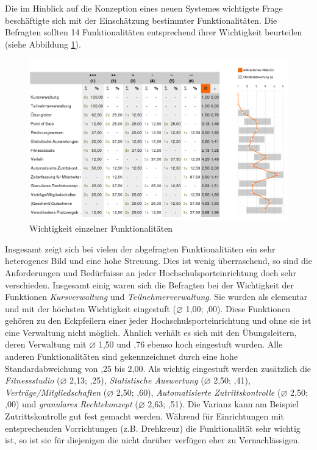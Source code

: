 Die im Hinblick auf die Konzeption eines neuen Systemes wichtigste Frage beschäftigte sich mit der Einschätzung bestimmter Funktionalitäten. Die Befragten sollten 14 Funktionalitäten entsprechend ihrer Wichtigkeit beurteilen (siehe Abbildung \ref{fig:Umfrage_funktionen}).
	\begin{figure}[h]
		\centering
		\includegraphics[width=1\linewidth]{images/umfrage_funktionen}
		\caption{Wichtigkeit einzelner Funktionalitäten}
		\label{fig:Umfrage_funktionen}
	\end{figure}

Insgesamt zeigt sich bei vielen der abgefragten Funktionalitäten ein sehr heterogenes Bild und eine hohe Streuung. Dies ist wenig überraschend, so sind die Anforderungen und Bedürfnisse an jeder Hochschulsporteinrichtung doch sehr verschieden.
Insgesamt einig waren sich die Befragten bei der Wichtigkeit der Funktionen \textit{Kursverwaltung} und \textit{Teilnehmerverwaltung}. Sie wurden als elementar und mit der höchsten Wichtigkeit eingestuft ($\varnothing$ 1,00; ,00). Diese Funktionen gehören zu den Eckpfeilern einer jeder Hochschulsporteinrichtung und ohne sie ist eine Verwaltung nicht möglich. Ähnlich verhält es sich mit den Übungsleitern, deren Verwaltung mit $\varnothing$ 1,50 und ,76 ebenso hoch eingestuft wurden.
Alle anderen Funktionalitäten sind gekennzeichnet durch eine hohe Standardabweichung von ,25 bis 2,00. Als wichtig eingestuft werden zusätzlich die \textit{Fitnessstudio} ($\varnothing$ 2,13; ,25), \textit{Statistische Auswertung} ($\varnothing$ 2,50; ,41), \textit{Verträge/Mitgliedschaften} ($\varnothing$ 2,50; ,60), \textit{Automatisierte Zutrittskontrolle} ($\varnothing$ 2,50; ,00) und \textit{granulares Rechtekonzept} ($\varnothing$ 2,63; ,51). Die Varianz kann am Beispiel Zutrittskontrolle gut fest gemacht werden. Während für Einrichtungen mit entsprechenden Vorrichtungen (z.B. Drehkreuz) die Funktionalität sehr wichtig ist, so ist sie für diejenigen die nicht darüber verfügen eher zu Vernachlässigen.

